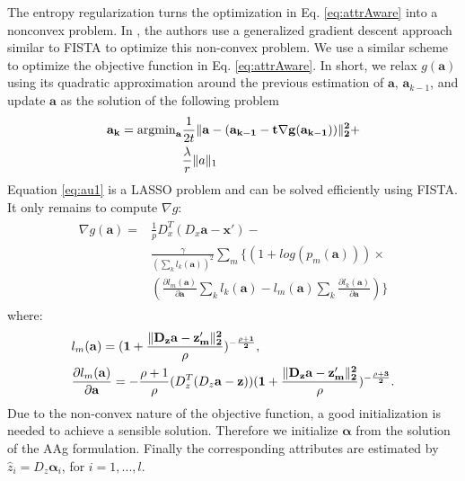 \documentclass[letterpaper]{article} %
\def\x{\mathbf{x}}
\def\a{\mathbf{a}}
\def\balpha{\boldsymbol{\alpha}}
\begin{document}
The entropy regularization turns the optimization in Eq. \eqref{eq:attrAware} into a nonconvex problem. In \cite{huang2016sparse}, the authors use a generalized gradient descent approach similar to FISTA to optimize this non-convex problem. We use a similar scheme to optimize the objective function in Eq. \eqref{eq:attrAware}. In short, we relax $g(\a)$  using its quadratic approximation   around the previous estimation of $\a$, $\a_{k-1}$, and update $\a$ as the solution of the following problem %
\begin{eqnarray}
\begin{split}
\bf{a}_k = \operatorname{argmin}_{\bf{a}}&
\frac{1}{2t}\|\bf{a}-(\bf{a}_{k-1}-t\nabla g(\bf{a}_{k-1}))\|_2^2+\\& \frac{\lambda}{r}\|a\|_1
\end{split}
\label{eq:au1}
\end{eqnarray}
Equation \eqref{eq:au1} is a LASSO problem and can be solved efficiently using FISTA. It only remains to compute  $\nabla g$: 
{\small\begin{eqnarray}
\begin{split}
\nabla g(\a) = &  \frac{1}{p}D_x^T(D_x\a-\x')-\\& \frac{\gamma}{(\sum_k l_k(\a))^2} \sum_m\{(1+log(p_m(\a)))\times \\&(\frac{\partial l_m(\a)}{\partial \a}\sum_k l_k(\a)-l_m(\a)\sum_k \frac{\partial l_k(\a)}{\partial \a}) \}
\end{split}
\label{eq:au2}
\end{eqnarray} }
where:
{\small
\begin{equation*}
\begin{split}
&l_m(\bf{a})=(1+\frac{\| D_z{\bf a}-\bf{z}'_m\|_2^2}{\rho})^{-\frac{\rho+1}{2}},\\&\frac{\partial l_m({\bf a})}{\partial{ \bf a}}=-\frac{\rho+1}{\rho}(D_z^T(D_z{\bf a}-\bf{z}))   (1+\frac{\|D_z{\bf a}-\bf{z}'_m\|_2^2}{\rho})^{-\frac{\rho+3}{2}}.
\end{split}
\label{eq:au4}
\end{equation*}}
Due to the non-convex nature of the objective function, a good initialization is needed to achieve a sensible solution. Therefore we initialize $\balpha$ from the solution of the AAg formulation. Finally the corresponding attributes are estimated by $\hat{z}_i=D_z\balpha_i$, for $i=1,...,l$.

\end{document}
